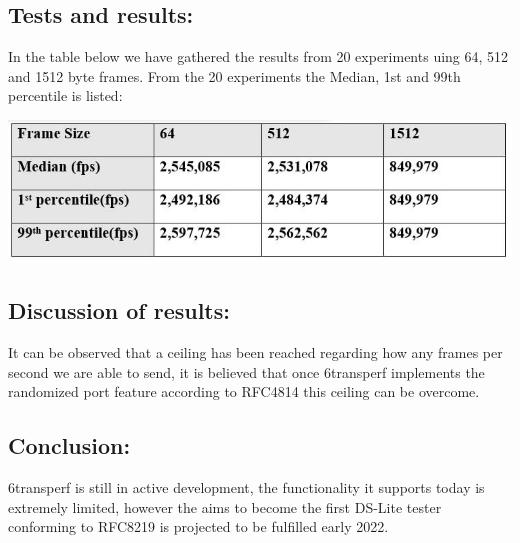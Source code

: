 \documentclass[a4paper,12p,titlepage]{article}
\begin{document}
\subsection{Tests and results:}

In the table below we have gathered the results from 20 experiments uing 64, 512 and 1512 byte frames. From the 20 experiments the Median, 1st and 99th percentile is listed: 

\includegraphics[width=\textwidth]{results}

\subsection{Discussion of results:}
It can be observed that a ceiling has been reached regarding how any frames per second we are able to send, it is believed that once 6transperf implements the randomized port feature according to RFC4814 this ceiling can be overcome.
\subsection{Conclusion:}
6transperf is still in active development, the functionality it supports today is extremely limited, however the aims to become the first DS-Lite tester conforming to RFC8219 is projected to be fulfilled early 2022.
\end{document}
